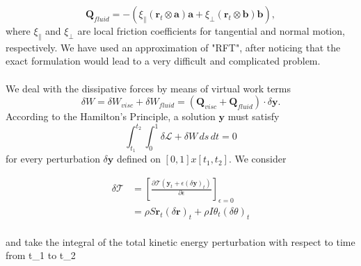 \documentclass[12pt]{article}
\begin{document}
\[\mathbf{Q}_{fluid} = -( \xi_\parallel (\mathbf{r}_t\otimes\mathbf{a})\mathbf{a} + \xi_\perp (\mathbf{r}_t\otimes\mathbf{b})\mathbf{b}),
\]
where $\xi_\parallel$ and $\xi_\perp$ are local friction coefficients for tangential and normal motion, respectively.
We have used an approximation of "RFT", after noticing that the exact formulation would lead to a very difficult and complicated problem.\\\\
We deal with the dissipative forces by means of virtual work terms
\[\delta W = \delta W_{visc} + \delta W_{fluid} = (\mathbf{Q}_{visc}+\mathbf{Q}_{fluid})\cdot\delta\mathbf{y}.
\]
According to the Hamilton's Principle, a solution $\mathbf{y}$ must satisfy
\[\int_{t_1}^{t_2} \int_{0}^{1} \delta \mathcal{L}+\delta W\, ds \, dt = 0
\]
for every perturbation $\delta \mathbf{y}$ defined on $[0,1]x[t_1,t_2]$. We consider 

\begin{equation}
\begin{split}

 \delta\mathcal{T}& = \left[ \frac{\partial \mathcal{T}(\mathbf{y}_t + \epsilon (\delta \mathbf{y})_t )}{\partial{\epsilon}}\right]_{\epsilon=0}\\
                  & = \rho S\mathbf{r}_t (\delta\mathbf{r})_t + \rho I \theta_t (\delta \theta)_t\\
\end{split}
\end{equation}

and take the integral of the total kinetic energy perturbation with respect to time from t_1 to t_2
\end{document}
